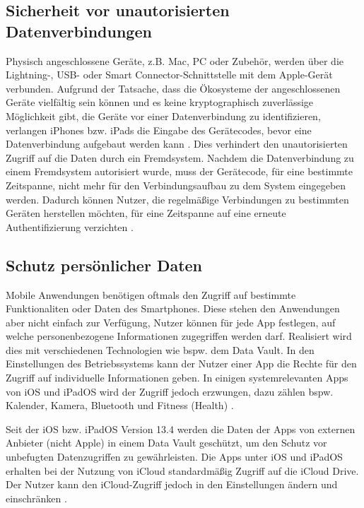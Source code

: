 \subsection{Sicherheit vor unautorisierten  Datenverbindungen}
Physisch angeschlossene Geräte,  z.B. Mac, PC oder Zubehör, werden über die Lightning-, USB- oder Smart 
Connector-Schnittstelle mit dem Apple-Gerät verbunden. Aufgrund der Tatsache, dass die Ökosysteme der
angeschlossenen Geräte vielfältig sein können und es keine kryptographisch zuverlässige Möglichkeit gibt,
die Geräte vor einer Datenverbindung zu identifizieren, verlangen iPhones bzw. iPads die Eingabe des Gerätecodes,
bevor eine Datenverbindung aufgebaut werden kann \cite[S. 65]{apple2020}. Dies verhindert den unautorisierten
Zugriff auf die Daten durch ein Fremdsystem. Nachdem die Datenverbindung zu einem Fremdsystem autorisiert wurde, 
muss der Gerätecode, für eine bestimmte Zeitspanne, nicht mehr für den Verbindungsaufbau zu dem System 
eingegeben werden. Dadurch können Nutzer, die regelmäßige Verbindungen zu bestimmten Geräten herstellen möchten,
für eine Zeitspanne auf eine erneute Authentifizierung verzichten
\cite{apple2020}.

\subsection{Schutz persönlicher Daten}
Mobile Anwendungen benötigen oftmals den Zugriff auf bestimmte Funktionaliten oder Daten des Smartphones.
Diese stehen den Anwendungen aber nicht einfach zur Verfügung, Nutzer können für jede App festlegen, auf 
welche personenbezogene Informationen zugegriffen werden darf. Realisiert wird dies mit verschiedenen Technologien 
wie bspw. dem Data Vault. In den Einstellungen des Betriebssystems kann der Nutzer einer App die Rechte für den Zugriff 
auf individuelle Informationen geben. In einigen systemrelevanten Apps von iOS und iPadOS wird der Zugriff jedoch erzwungen, 
dazu zählen bspw. Kalender, Kamera, Bluetooth und Fitness (Health)
\cite{apple2020}.

Seit der iOS bzw. iPadOS Version 13.4 werden die Daten der Apps von externen Anbieter (nicht Apple) in einem Data Vault geschützt, 
um den Schutz vor unbefugten Datenzugriffen zu gewährleisten. Die Apps unter iOS und iPadOS erhalten bei der Nutzung von iCloud 
standardmäßig Zugriff auf die iCloud Drive. Der Nutzer kann den iCloud-Zugriff
jedoch in den Einstellungen ändern und einschränken \cite{apple2020}.


